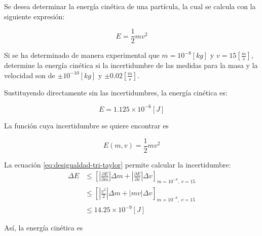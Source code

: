 \begin{ex}

    Se desea determinar la energía cinética de una partícula, la cual se
    calcula con la siguiente expresión:

    \begin{equation*}
        E = \frac{1}{2} m v^2
    \end{equation*}

    Si se ha determinado de manera experimental que \(m = 10^{-8} [\si{kg}]\)
    y \(v = 15 \left[\si{ \frac{m}{s} } \right]\), determine la energía
    cinética si la incertidumbre de las medidas para la masa y la velocidad son
    de \(\pm 10^{-10} [\si{kg}]\) y $\pm 0.02 \left[ \si{\frac{m}{s}}
    \right]$.

    \begin{solution}

        Sustituyendo directamente sin las incertidumbres, la energía cinética
        es:

        \begin{equation*}
            E = 1.125 \times 10^{-6} [\si{J}]
        \end{equation*}

        La función cuya incertidumbre se quiere encontrar es

        \begin{equation*}
            E(m, v) = \frac{1}{2} m v^2
        \end{equation*}

        La ecuación \ref{eq:desigualdad-tri-taylor} permite calcular la
        incertidumbre:
        \begin{align*}
            \Delta E &\leq \left[ \left| \frac{\partial E}{\partial m}
                \right| \Delta m + \left| \frac{\partial E}{\partial v}
            \right| \Delta v \right]_{m = 10^{-8},\ v = 15}\\
                     &\leq \left[ \left| \frac{v^2}{2}
                         \right| \Delta m + \left| m v \right| \Delta v
                     \right]_{m = 10^{-8},\ v = 15} \\
                     &\leq 14.25 \times 10^{-9} [\si{J}]
            \end{align*}

            Así, la energía cinética es

            \begin{center}
            \end{center}

        \end{solution}
    \end{ex}
